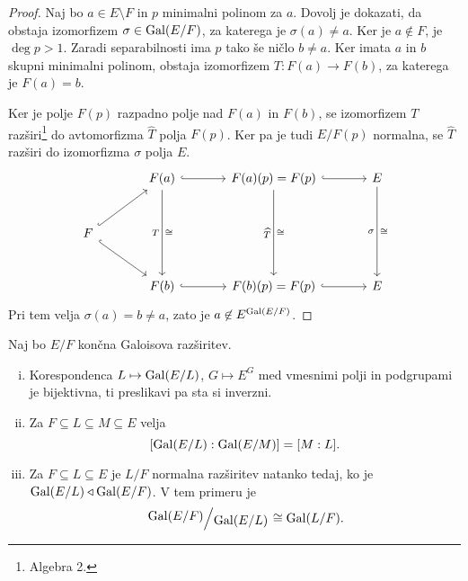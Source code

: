 \begin{proof}
Naj bo $a \in E \setminus F$ in $p$ minimalni polinom za $a$.
Dovolj je dokazati, da obstaja izomorfizem $\sigma \in \operatorname{Gal}(E/F)$,
za katerega je $\sigma(a) \ne a$. Ker je $a \not \in F$, je
$\deg p > 1$. Zaradi separabilnosti ima $p$ tako še ničlo
$b \ne a$. Ker imata $a$ in $b$ skupni minimalni polinom, obstaja
izomorfizem $T \colon F(a) \to F(b)$, za katerega je $F(a) = b$.

Ker je polje $F(p)$ razpadno polje nad $F(a)$ in $F(b)$, se
izomorfizem $T$ razširi\footnote{Algebra 2.} do avtomorfizma
$\widehat{T}$ polja $F(p)$. Ker pa je tudi $E / F(p)$ normalna, se
$\widehat{T}$ razširi do izomorfizma $\sigma$ polja $E$.
\[
\begin{tikzcd}[row sep=large, column sep=large]
&
F(a)
\arrow[r, hookrightarrow] \arrow[dd, "\cong", "T"']
&
F(a)(p) = F(p)
\arrow[r, hookrightarrow] \arrow[dd, "\cong", "\widehat{T}"']
&
E
\arrow[dd, "\cong", "\sigma"']
\\
F
\arrow[ur, hookrightarrow] \arrow[dr, hookrightarrow]
\\
&
F(b)
\arrow[r, hookrightarrow]
&
F(b)(p) = F(p)
\arrow[r, hookrightarrow]
&
E
\end{tikzcd}
\]
Pri tem velja $\sigma(a) = b \ne a$, zato je
$a \not \in E^{\operatorname{Gal}(E/F)}$.
\end{proof}

\begin{izrek}
Naj bo $E/F$ končna Galoisova razširitev.

\begin{enumerate}[i)]
\item Korespondenca $L \mapsto \operatorname{Gal}(E/L)$, $G \mapsto E^G$ med
vmesnimi polji in podgrupami je bijektivna, ti preslikavi pa sta si
inverzni.
\item Za $F \subseteq L \subseteq M \subseteq E$ velja
\[
[\operatorname{Gal}(E/L) : \operatorname{Gal}(E/M)] = [M : L].
\]
\item Za $F \subseteq L \subseteq E$ je $L/F$ normalna razširitev
natanko tedaj, ko je $\operatorname{Gal}(E/L) \triangleleft \operatorname{Gal}(E/F)$. V tem primeru je
\[
\kvoc{\Gal(E/F)}{\Gal(E/L)} \cong \Gal(L/F).
\]
\end{enumerate}
\end{izrek}

